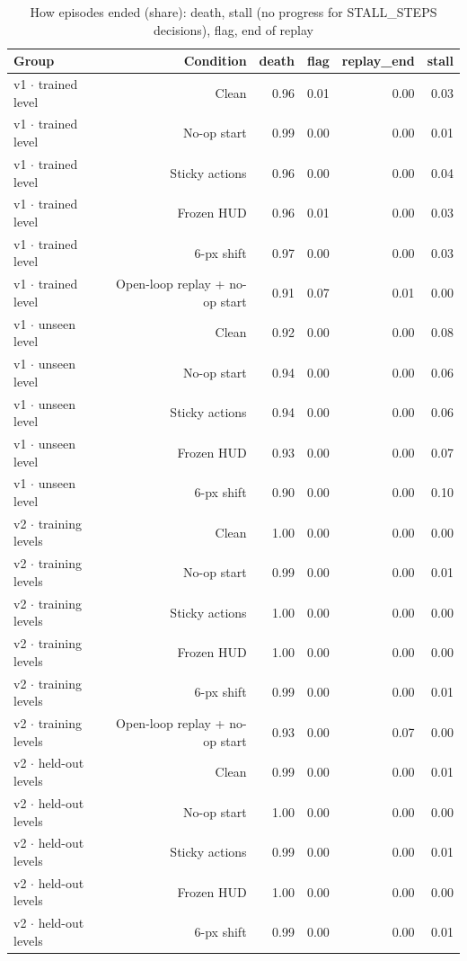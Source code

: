 \begin{table}[t]
\centering
\caption{How episodes ended (share): death, stall (no progress for STALL\_STEPS decisions), flag, end of replay}
\label{tab:episode_endings}
\begin{tabular}{lrrrrr}
\toprule
Group & Condition & death & flag & replay\_end & stall \\
\midrule
v1 $\cdot$ trained level & Clean & 0.96 & 0.01 & 0.00 & 0.03 \\
v1 $\cdot$ trained level & No-op start & 0.99 & 0.00 & 0.00 & 0.01 \\
v1 $\cdot$ trained level & Sticky actions & 0.96 & 0.00 & 0.00 & 0.04 \\
v1 $\cdot$ trained level & Frozen HUD & 0.96 & 0.01 & 0.00 & 0.03 \\
v1 $\cdot$ trained level & 6-px shift & 0.97 & 0.00 & 0.00 & 0.03 \\
v1 $\cdot$ trained level & Open-loop replay + no-op start & 0.91 & 0.07 & 0.01 & 0.00 \\
v1 $\cdot$ unseen level & Clean & 0.92 & 0.00 & 0.00 & 0.08 \\
v1 $\cdot$ unseen level & No-op start & 0.94 & 0.00 & 0.00 & 0.06 \\
v1 $\cdot$ unseen level & Sticky actions & 0.94 & 0.00 & 0.00 & 0.06 \\
v1 $\cdot$ unseen level & Frozen HUD & 0.93 & 0.00 & 0.00 & 0.07 \\
v1 $\cdot$ unseen level & 6-px shift & 0.90 & 0.00 & 0.00 & 0.10 \\
v2 $\cdot$ training levels & Clean & 1.00 & 0.00 & 0.00 & 0.00 \\
v2 $\cdot$ training levels & No-op start & 0.99 & 0.00 & 0.00 & 0.01 \\
v2 $\cdot$ training levels & Sticky actions & 1.00 & 0.00 & 0.00 & 0.00 \\
v2 $\cdot$ training levels & Frozen HUD & 1.00 & 0.00 & 0.00 & 0.00 \\
v2 $\cdot$ training levels & 6-px shift & 0.99 & 0.00 & 0.00 & 0.01 \\
v2 $\cdot$ training levels & Open-loop replay + no-op start & 0.93 & 0.00 & 0.07 & 0.00 \\
v2 $\cdot$ held-out levels & Clean & 0.99 & 0.00 & 0.00 & 0.01 \\
v2 $\cdot$ held-out levels & No-op start & 1.00 & 0.00 & 0.00 & 0.00 \\
v2 $\cdot$ held-out levels & Sticky actions & 0.99 & 0.00 & 0.00 & 0.01 \\
v2 $\cdot$ held-out levels & Frozen HUD & 1.00 & 0.00 & 0.00 & 0.00 \\
v2 $\cdot$ held-out levels & 6-px shift & 0.99 & 0.00 & 0.00 & 0.01 \\
\bottomrule
\end{tabular}
\end{table}
